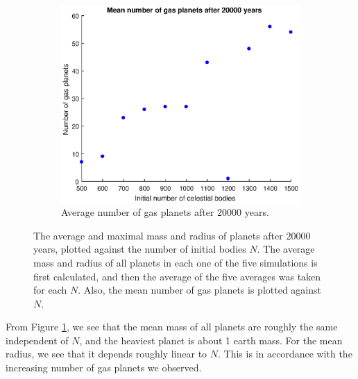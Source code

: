 \begin{figure}[H]
	\begin{subfigure}{0.5\textwidth}
	\includegraphics[width=\textwidth]{AantalGasPlaneten.eps}
	\caption{Average number of gas planets after 20000 years.}
	\end{subfigure}
	\caption{The average and maximal mass and radius of planets after 20000 years, plotted against the number of initial bodies $N$. The average mass and radius of all planets in each one of the five simulations is first calculated, and then the average of the five averages was taken for each $N$. Also, the mean number of gas planets is plotted against $N$.}
	\label{AverageMassandRadiusEnGasNieuw}
\end{figure} 
From Figure \ref{AverageMassandRadiusEnGasNieuw}, we see that the mean mass of all planets are roughly the same independent of $N$, and the heaviest planet is about 1 earth mass. For the mean radius, we see that it depends roughly linear to $N$. This is in accordance with the increasing number of gas planets we observed.